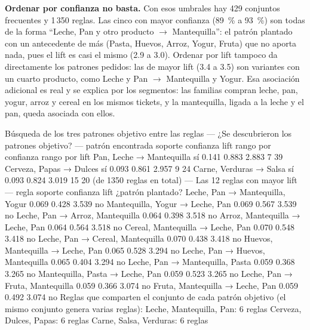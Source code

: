 \documentclass[11pt,letterpaper]{article}
\begin{document}
\textbf{Ordenar por confianza no basta.} Con esos umbrales hay 429 conjuntos frecuentes y 1\,350 reglas. Las cinco con mayor confianza (89~\% a 93~\%) son todas de la forma ``Leche, Pan y otro producto $\rightarrow$ Mantequilla'': el patrón plantado con un antecedente de más (Pasta, Huevos, Arroz, Yogur, Fruta) que no aporta nada, pues el lift es casi el mismo (2.9 a 3.0). Ordenar por lift tampoco da directamente los patrones pedidos: las de mayor lift (3.4 a 3.5) son variantes con un cuarto producto, como Leche y Pan $\rightarrow$ Mantequilla y Yogur. Esa asociación adicional es real y se explica por los segmentos: las familias compran leche, pan, yogur, arroz y cereal en los mismos tickets, y la mantequilla, ligada a la leche y el pan, queda asociada con ellos.

\begin{consola}[label=out:objetivo]{Búsqueda de los tres patrones objetivo entre las reglas}
--- ¿Se descubrieron los patrones objetivo? ---
                  patrón encontrada  soporte  confianza  lift  rango por confianza  rango por lift
Pan, Leche → Mantequilla         sí    0.141      0.883 2.883                    7              39
 Cerveza, Papas → Dulces         sí    0.093      0.861 2.957                    9              24
 Carne, Verduras → Salsa         sí    0.093      0.824 3.019                   15              20
(de 1350 reglas en total)
--- Las 12 reglas con mayor lift ---
                           regla  soporte  confianza  lift ¿patrón plantado?
 Leche, Pan → Mantequilla, Yogur    0.069      0.428 3.539                no
 Mantequilla, Yogur → Leche, Pan    0.069      0.567 3.539                no
 Leche, Pan → Arroz, Mantequilla    0.064      0.398 3.518                no
 Arroz, Mantequilla → Leche, Pan    0.064      0.564 3.518                no
Cereal, Mantequilla → Leche, Pan    0.070      0.548 3.418                no
Leche, Pan → Cereal, Mantequilla    0.070      0.438 3.418                no
Huevos, Mantequilla → Leche, Pan    0.065      0.528 3.294                no
Leche, Pan → Huevos, Mantequilla    0.065      0.404 3.294                no
 Leche, Pan → Mantequilla, Pasta    0.059      0.368 3.265                no
 Mantequilla, Pasta → Leche, Pan    0.059      0.523 3.265                no
 Leche, Pan → Fruta, Mantequilla    0.059      0.366 3.074                no
 Fruta, Mantequilla → Leche, Pan    0.059      0.492 3.074                no
Reglas que comparten el conjunto de cada patrón objetivo (el mismo conjunto genera varias reglas):
  {Leche, Mantequilla, Pan}: 6 reglas
  {Cerveza, Dulces, Papas}: 6 reglas
  {Carne, Salsa, Verduras}: 6 reglas
\end{consola}
\end{document}
